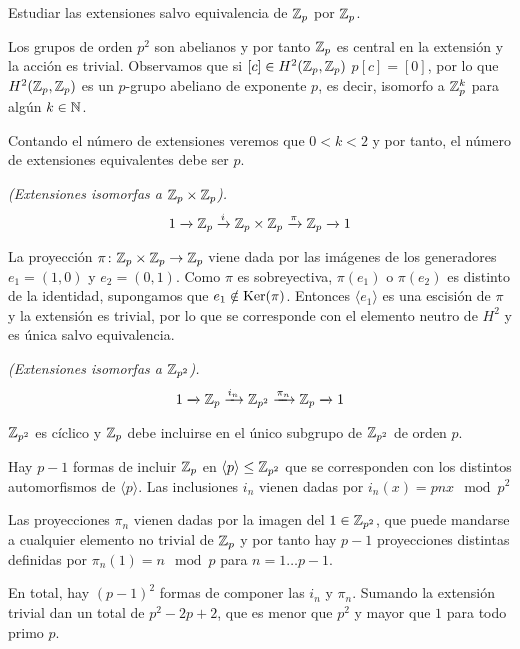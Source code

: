 \begin{ejercicio}
	Estudiar las extensiones salvo equivalencia de $\Z_p$ por $\Z_p$. %
	
		Los grupos de orden $p^2$ son abelianos y por tanto $\Z_p$ es central en la extensión y la acción es trivial.
		Observamos que si $[c]\in H^2(\Z_p,\Z_p)$ $p[c] = [0]$, por lo que $H^2(\Z_p,\Z_p)$ es un $p$-grupo abeliano de exponente $p$, es decir, isomorfo a $\Z_p^k$ para algún $k\in \N$.
		
		Contando el número de extensiones veremos que $0<k<2$ y por tanto, el número de extensiones equivalentes debe ser $p$.
		
		\textit{(Extensiones isomorfas a $\Z_p\times \Z_p$).}
		\begin{equation*}
			\extension i \pi {\Z_p} {\Z_p\times \Z_p} {\Z_p}
		\end{equation*}
		
		La proyección $\homo \pi {\Z_p\times \Z_p} {\Z_p}$ viene dada por las imágenes de los generadores $e_1=(1,0)$ y $e_2=(0,1)$. Como $\pi$ es sobreyectiva, $\pi(e_1)$ o $\pi(e_2)$ es distinto de la identidad, supongamos que $e_1\notin \Ker(\pi)$. Entonces $\langle e_1 \rangle$ es una escisión de $\pi$ y la extensión es trivial, por lo que se corresponde con el elemento neutro de $H^2$ y es única salvo equivalencia.
		
		\textit{(Extensiones isomorfas a $\Z_{p^2}$).}
		\begin{equation*}
			\extension {i_n} {\pi_n} {\Z_p} {\Z_{p^2}} {\Z_p}
		\end{equation*}
		
		$\Z_{p^2}$ es cíclico y $\Z_p$ debe incluirse en el único subgrupo de $\Z_{p^2}$ de orden $p$. 
		
		Hay $p-1$ formas de incluir $\Z_p$ en $\langle p \rangle \leq \Z_{p^2}$ que se corresponden con los distintos automorfismos de $\langle p \rangle$. Las inclusiones $i_n$ vienen dadas por $i_n(x) = pnx \mod p^2$
		
		Las proyecciones $\pi_n$ vienen dadas por la imagen del $1\in \Z_{p^2}$, que puede mandarse a cualquier elemento no trivial de $\Z_p$ y por tanto hay $p-1$ proyecciones distintas definidas por $\pi_n(1) = n \mod p$ para $n=1\ldots p-1$.
		
		En total, hay $(p-1)^2$ formas de componer las $i_n$ y $\pi_n$. Sumando la extensión trivial dan un total de $p^2-2p+2$, que es menor que $p^2$ y mayor que $1$ para todo primo $p$. 
		

\end{ejercicio}
